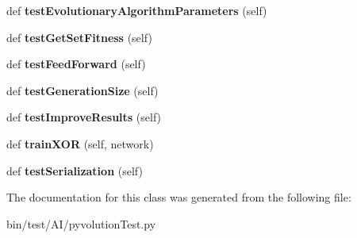 \begin{DoxyCompactItemize}
\item 
def {\bfseries test\+Evolutionary\+Algorithm\+Parameters} (self)\hypertarget{classpyvolutionTest_1_1pyvolutionTest_a7917d35ed20e2d9aa232e02438259dba}{}\label{classpyvolutionTest_1_1pyvolutionTest_a7917d35ed20e2d9aa232e02438259dba}

\item 
def {\bfseries test\+Get\+Set\+Fitness} (self)\hypertarget{classpyvolutionTest_1_1pyvolutionTest_a03e3607cdb140367cdcce4b98dc60dd1}{}\label{classpyvolutionTest_1_1pyvolutionTest_a03e3607cdb140367cdcce4b98dc60dd1}

\item 
def {\bfseries test\+Feed\+Forward} (self)\hypertarget{classpyvolutionTest_1_1pyvolutionTest_a5671643d8329b03799e9d2c6bf933c77}{}\label{classpyvolutionTest_1_1pyvolutionTest_a5671643d8329b03799e9d2c6bf933c77}

\item 
def {\bfseries test\+Generation\+Size} (self)\hypertarget{classpyvolutionTest_1_1pyvolutionTest_a8d4cfbbedea4b1aa2a0544b70571e4ea}{}\label{classpyvolutionTest_1_1pyvolutionTest_a8d4cfbbedea4b1aa2a0544b70571e4ea}

\item 
def {\bfseries test\+Improve\+Results} (self)\hypertarget{classpyvolutionTest_1_1pyvolutionTest_acd0560d5f7d7ea858799d37102c632d0}{}\label{classpyvolutionTest_1_1pyvolutionTest_acd0560d5f7d7ea858799d37102c632d0}

\item 
def {\bfseries train\+X\+OR} (self, network)\hypertarget{classpyvolutionTest_1_1pyvolutionTest_afb521a424c2061b4393044cc2afc74f8}{}\label{classpyvolutionTest_1_1pyvolutionTest_afb521a424c2061b4393044cc2afc74f8}

\item 
def {\bfseries test\+Serialization} (self)\hypertarget{classpyvolutionTest_1_1pyvolutionTest_a540276d681fd27876a065c7da9d04085}{}\label{classpyvolutionTest_1_1pyvolutionTest_a540276d681fd27876a065c7da9d04085}

\end{DoxyCompactItemize}


The documentation for this class was generated from the following file\+:\begin{DoxyCompactItemize}
\item 
bin/test/\+A\+I/pyvolution\+Test.\+py\end{DoxyCompactItemize}
